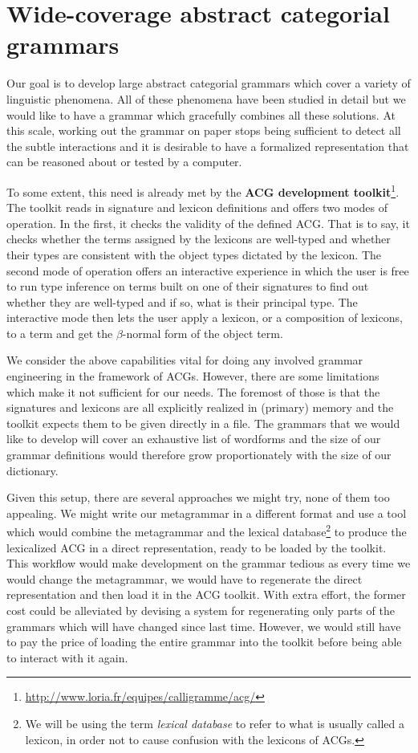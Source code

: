 \section{Wide-coverage abstract categorial grammars}

Our goal is to develop large abstract categorial grammars which cover a
variety of linguistic phenomena. All of these phenomena have been
studied in detail but we would like to have a grammar which gracefully
combines all these solutions. At this scale, working out the grammar on
paper stops being sufficient to detect all the subtle interactions and
it is desirable to have a formalized representation that can be reasoned
about or tested by a computer.

To some extent, this need is already met by the \textbf{ACG development
  toolkit}\footnote{\url{http://www.loria.fr/equipes/calligramme/acg/}}. The
toolkit reads in signature and lexicon definitions and offers two modes
of operation. In the first, it checks the validity of the defined
ACG. That is to say, it checks whether the terms assigned by the
lexicons are well-typed and whether their types are consistent with the
object types dictated by the lexicon. The second mode of operation
offers an interactive experience in which the user is free to run type
inference on terms built on one of their signatures to find out whether
they are well-typed and if so, what is their principal type. The
interactive mode then lets the user apply a lexicon, or a composition of
lexicons, to a term and get the $\beta$-normal form of the object term.

We consider the above capabilities vital for doing any involved grammar
engineering in the framework of ACGs. However, there are some
limitations which make it not sufficient for our needs. The foremost of
those is that the signatures and lexicons are all explicitly realized in
(primary) memory and the toolkit expects them to be given directly in a
file. The grammars that we would like to develop will cover an
exhaustive list of wordforms and the size of our grammar definitions
would therefore grow proportionately with the size of our dictionary.

Given this setup, there are several approaches we might try, none of
them too appealing. We might write our metagrammar in a different format
and use a tool which would combine the metagrammar and the lexical
database\footnote{We will be using the term \emph{lexical database} to
  refer to what is usually called a lexicon, in order not to cause
  confusion with the lexicons of ACGs.} to produce the lexicalized ACG
in a direct representation, ready to be loaded by the toolkit. This
workflow would make development on the grammar tedious as every time we
would change the metagrammar, we would have to regenerate the direct
representation and then load it in the ACG toolkit. With extra effort,
the former cost could be alleviated by devising a system for
regenerating only parts of the grammars which will have changed since
last time. However, we would still have to pay the price of loading the
entire grammar into the toolkit before being able to interact with it
again.

